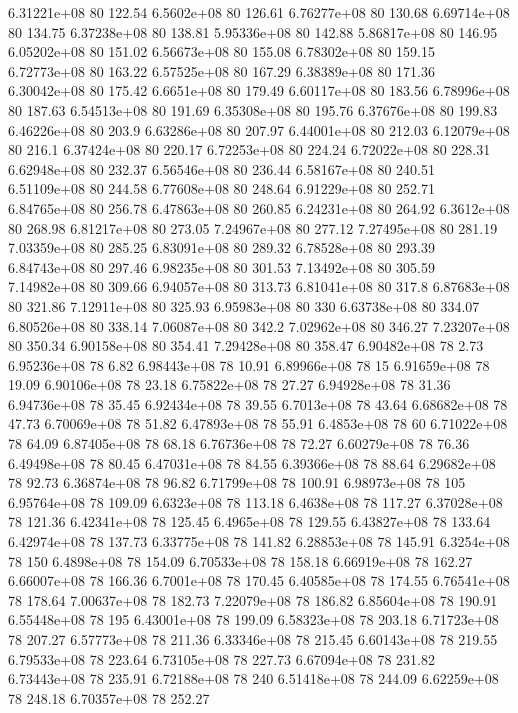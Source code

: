 6.31221e+08 80 122.54
6.5602e+08 80 126.61
6.76277e+08 80 130.68
6.69714e+08 80 134.75
6.37238e+08 80 138.81
5.95336e+08 80 142.88
5.86817e+08 80 146.95
6.05202e+08 80 151.02
6.56673e+08 80 155.08
6.78302e+08 80 159.15
6.72773e+08 80 163.22
6.57525e+08 80 167.29
6.38389e+08 80 171.36
6.30042e+08 80 175.42
6.6651e+08 80 179.49
6.60117e+08 80 183.56
6.78996e+08 80 187.63
6.54513e+08 80 191.69
6.35308e+08 80 195.76
6.37676e+08 80 199.83
6.46226e+08 80 203.9
6.63286e+08 80 207.97
6.44001e+08 80 212.03
6.12079e+08 80 216.1
6.37424e+08 80 220.17
6.72253e+08 80 224.24
6.72022e+08 80 228.31
6.62948e+08 80 232.37
6.56546e+08 80 236.44
6.58167e+08 80 240.51
6.51109e+08 80 244.58
6.77608e+08 80 248.64
6.91229e+08 80 252.71
6.84765e+08 80 256.78
6.47863e+08 80 260.85
6.24231e+08 80 264.92
6.3612e+08 80 268.98
6.81217e+08 80 273.05
7.24967e+08 80 277.12
7.27495e+08 80 281.19
7.03359e+08 80 285.25
6.83091e+08 80 289.32
6.78528e+08 80 293.39
6.84743e+08 80 297.46
6.98235e+08 80 301.53
7.13492e+08 80 305.59
7.14982e+08 80 309.66
6.94057e+08 80 313.73
6.81041e+08 80 317.8
6.87683e+08 80 321.86
7.12911e+08 80 325.93
6.95983e+08 80 330
6.63738e+08 80 334.07
6.80526e+08 80 338.14
7.06087e+08 80 342.2
7.02962e+08 80 346.27
7.23207e+08 80 350.34
6.90158e+08 80 354.41
7.29428e+08 80 358.47
6.90482e+08 78 2.73
6.95236e+08 78 6.82
6.98443e+08 78 10.91
6.89966e+08 78 15
6.91659e+08 78 19.09
6.90106e+08 78 23.18
6.75822e+08 78 27.27
6.94928e+08 78 31.36
6.94736e+08 78 35.45
6.92434e+08 78 39.55
6.7013e+08 78 43.64
6.68682e+08 78 47.73
6.70069e+08 78 51.82
6.47893e+08 78 55.91
6.4853e+08 78 60
6.71022e+08 78 64.09
6.87405e+08 78 68.18
6.76736e+08 78 72.27
6.60279e+08 78 76.36
6.49498e+08 78 80.45
6.47031e+08 78 84.55
6.39366e+08 78 88.64
6.29682e+08 78 92.73
6.36874e+08 78 96.82
6.71799e+08 78 100.91
6.98973e+08 78 105
6.95764e+08 78 109.09
6.6323e+08 78 113.18
6.4638e+08 78 117.27
6.37028e+08 78 121.36
6.42341e+08 78 125.45
6.4965e+08 78 129.55
6.43827e+08 78 133.64
6.42974e+08 78 137.73
6.33775e+08 78 141.82
6.28853e+08 78 145.91
6.3254e+08 78 150
6.4898e+08 78 154.09
6.70533e+08 78 158.18
6.66919e+08 78 162.27
6.66007e+08 78 166.36
6.7001e+08 78 170.45
6.40585e+08 78 174.55
6.76541e+08 78 178.64
7.00637e+08 78 182.73
7.22079e+08 78 186.82
6.85604e+08 78 190.91
6.55448e+08 78 195
6.43001e+08 78 199.09
6.58323e+08 78 203.18
6.71723e+08 78 207.27
6.57773e+08 78 211.36
6.33346e+08 78 215.45
6.60143e+08 78 219.55
6.79533e+08 78 223.64
6.73105e+08 78 227.73
6.67094e+08 78 231.82
6.73443e+08 78 235.91
6.72188e+08 78 240
6.51418e+08 78 244.09
6.62259e+08 78 248.18
6.70357e+08 78 252.27
